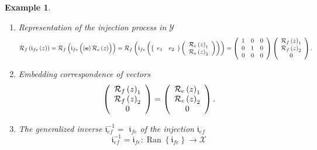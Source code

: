 \documentclass[aps,preprint]{revtex4}%
\newtheorem{example}[theorem]{Example}
\begin{document}
\begin{example}
\begin{enumerate}
\begin{enumerate}
\item Representation of the injection process in $\mathcal{Y}$
\begin{equation}
\mathcal{R}_{f}\left(  \mathfrak{i}_{fe}\left(  z\right)  \right)
=\mathcal{R}_{f}\left(  \mathfrak{i}_{fe}\left(  \overset{}{\left(
\mathbf{e}\right)  \mathcal{R}_{e}\left(  z\right)  }\right)  \right)
=\mathcal{R}_{f}\left(  \mathfrak{i}_{fe}\left(  \left(
\begin{array}
[c]{cc}%
e_{1} & e_{2}%
\end{array}
\right)  \left(
\begin{array}
[c]{c}%
\mathcal{R}_{e}\left(  z\right)  _{1}\\
\mathcal{R}_{e}\left(  z\right)  _{2}%
\end{array}
\right)  \right)  \right)  =\left(
\begin{array}
[c]{ccc}%
1 & 0 & 0\\
0 & 1 & 0\\
0 & 0 & 0
\end{array}
\right)  \left(
\begin{array}
[c]{c}%
\mathcal{R}_{f}\left(  z\right)  _{1}\\
\mathcal{R}_{f}\left(  z\right)  _{2}\\
0
\end{array}
\right)  .
\end{equation}


\item Embedding correspondence of vectors%
\begin{equation}
\left(
\begin{array}
[c]{c}%
\mathcal{R}_{f}\left(  z\right)  _{1}\\
\mathcal{R}_{f}\left(  z\right)  _{2}\\
0
\end{array}
\right)  =\left(
\begin{array}
[c]{c}%
\mathcal{R}_{e}\left(  z\right)  _{1}\\
\mathcal{R}_{e}\left(  z\right)  _{2}\\
0
\end{array}
\right)  .
\end{equation}


\item The \emph{generalized} inverse $\mathfrak{i}_{ef}^{-1}=$ $\mathfrak{i}%
_{fe}$ of the injection $\mathfrak{i}_{ef}$
\begin{equation}
\mathfrak{i}_{ef}^{-1}=\mathfrak{i}_{fe}:\operatorname{Ran}\left\{
\mathfrak{i}_{fe}\right\}  \rightarrow\mathcal{X}%
\end{equation}



\end{enumerate}
\end{enumerate}
\end{example}
\end{document}
